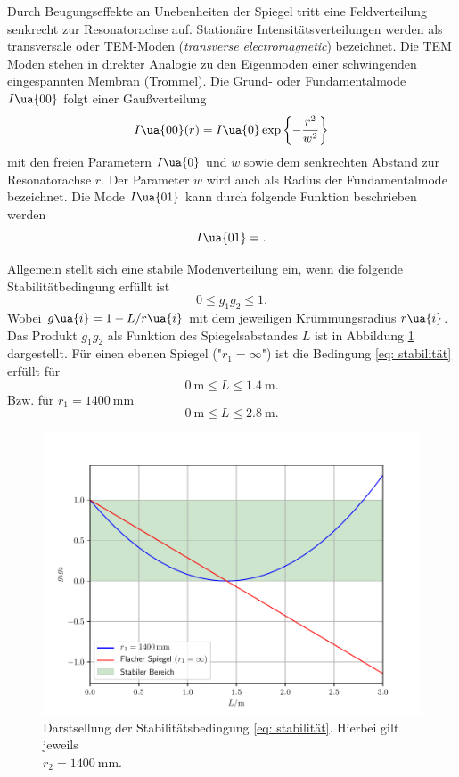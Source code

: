 Durch Beugungseffekte an Unebenheiten der Spiegel tritt eine Feldverteilung senkrecht zur Resonatorachse auf. Stationäre Intensitätsverteilungen
werden als transversale oder TEM-Moden (\textit{transverse electromagnetic}) bezeichnet. Die TEM Moden stehen in direkter Analogie zu den Eigenmoden
einer schwingenden eingespannten Membran (Trommel). Die Grund- oder Fundamentalmode $I\ua{00}$ folgt einer Gaußverteilung
\begin{equation}
  I\ua{00}(r) = I\ua{0}\exp\left\{- \frac{r^2}{w^2}\right\}
  \label{eq: tem00}
\end{equation}
mit den freien Parametern $I\ua{0}$ und $w$ sowie dem senkrechten Abstand zur Resonatorachse $r$. Der Parameter $w$ wird auch als Radius
der Fundamentalmode bezeichnet. Die Mode $I\ua{01}$ kann durch folgende Funktion beschrieben werden
\begin{equation}
  I\ua{01} = .
  \label{eq: tem01}
\end{equation}

Allgemein stellt sich eine stabile Modenverteilung
ein, wenn die folgende Stabilitätbedingung erfüllt ist
\begin{equation}
  0 \leq g_1 g_2 \leq 1.
  \label{eq: stabilität}
\end{equation}
Wobei $g\ua{i} = 1 - L/r\ua{i}$ mit dem jeweiligen Krümmungsradius $r\ua{i}$. Das Produkt $g_1g_2$
als Funktion des Spiegelsabstandes $L$ ist in Abbildung \ref{fig: stabilitätsbedingung} dargestellt.
Für einen ebenen Spiegel ("$r_1 = \infty$") ist die Bedingung \eqref{eq: stabilität} erfüllt für
\begin{equation}
  \SI{0}{\meter}\leq L \leq \SI{1.4}{\meter}.
\end{equation}
Bzw. für $r_1 = \SI{1400}{\milli\meter}$
\begin{equation}
  \SI{0}{\meter} \leq L \leq \SI{2.8}{\meter}.
\end{equation}
\begin{figure}
  \centering
  \includegraphics[width = \textwidth]{theorie_bilder/g_1_g_2.pdf}
  \caption{Darstsellung der Stabilitätsbedingung \eqref{eq: stabilität}. Hierbei gilt jeweils \\$r_2 = \SI{1400}{\milli\meter}$.}
  \label{fig: stabilitätsbedingung}
\end{figure}

